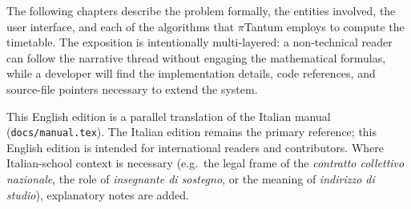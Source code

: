 The following chapters describe the problem formally, the
entities involved, the user interface, and each of the
algorithms that $\pi$Tantum employs to compute the timetable.
The exposition is intentionally multi-layered: a non-technical
reader can follow the narrative thread without engaging the
mathematical formulas, while a developer will find the
implementation details, code references, and source-file
pointers necessary to extend the system.

\bigskip

\noindent
This English edition is a parallel translation of the Italian
manual (\texttt{docs/manual.tex}). The Italian edition
remains the primary reference; this English edition is
intended for international readers and contributors. Where
Italian-school context is necessary (e.g.\ the legal frame of
the \emph{contratto collettivo nazionale}, the role of
\emph{insegnante di sostegno}, or the meaning of
\emph{indirizzo di studio}), explanatory notes are added.
